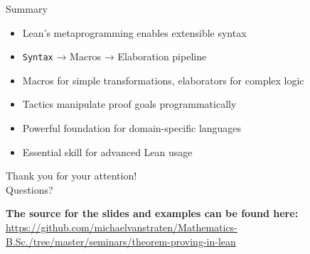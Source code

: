 \documentclass{beamer}
\begin{document}
\begin{frame}{Summary}
    \begin{itemize}[<+->]
        \item Lean's metaprogramming enables extensible syntax
        \item \lstinline{Syntax} → Macros → Elaboration pipeline
        \item Macros for simple transformations, elaborators for complex logic
        \item Tactics manipulate proof goals programmatically
        \item Powerful foundation for domain-specific languages
        \item Essential skill for advanced Lean usage
    \end{itemize}

    \vspace{1cm}
    \begin{center}
        \Large Thank you for your attention!\\
        \vspace{0.5cm}
        Questions?

        \textbf{The source for the slides and examples can be found here:}
        \url{https://github.com/michaelvanstraten/Mathematics-B.Sc./tree/master/seminars/theorem-proving-in-lean}
    \end{center}

\end{frame}
\endNoHyper
\end{document}
